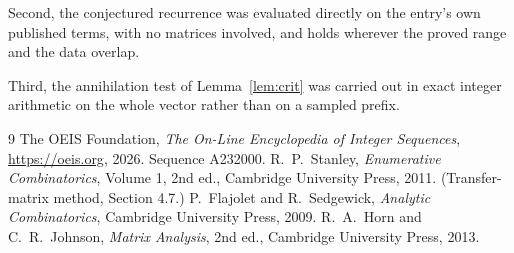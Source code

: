 \documentclass[11pt,a4paper]{article}
\theoremstyle{plain}
\theoremstyle{definition}
\begin{document}
Second, the conjectured recurrence was evaluated directly on the entry's own published terms,
with no matrices involved, and holds wherever the proved range and the data overlap.

Third, the annihilation test of Lemma~\ref{lem:crit} was carried out in exact integer
arithmetic on the whole vector rather than on a sampled prefix.

\begin{thebibliography}{9}
 The OEIS Foundation, \emph{The On-Line Encyclopedia of Integer
Sequences}, \url{https://oeis.org}, 2026. Sequence A232000.
 R.~P.~Stanley, \emph{Enumerative Combinatorics}, Volume 1, 2nd ed.,
Cambridge University Press, 2011. (Transfer-matrix method, Section 4.7.)
 P.~Flajolet and R.~Sedgewick, \emph{Analytic Combinatorics}, Cambridge
University Press, 2009.
 R.~A.~Horn and C.~R.~Johnson, \emph{Matrix Analysis}, 2nd ed., Cambridge
University Press, 2013.
\end{thebibliography}
\end{document}
